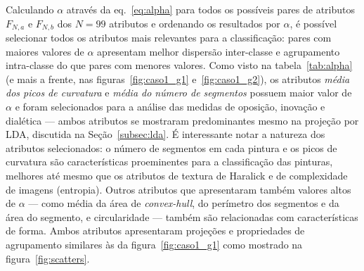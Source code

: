 Calculando $\alpha$ através da eq.~\ref{eq:alpha} para todos os
possíveis pares de atributos $F_{N, a}$ e $F_{N, b}$ dos $N = 99$
atributos e ordenando os resultados por $\alpha$, é possível
selecionar todos os atributos mais relevantes para a classificação:
pares com maiores valores de $\alpha$ apresentam melhor dispersão
inter-classe e agrupamento intra-classe do que pares com menores
valores. Como visto na tabela~\ref{tab:alpha} (e mais a frente, nas
figuras~\ref{fig:caso1_g1} e~\ref{fig:caso1_g2}), os atributos
\emph{média dos picos de curvatura} e \emph{média do número de
  segmentos} possuem maior valor de $\alpha$ e foram selecionados para
a análise das medidas de oposição, inovação e dialética --- ambos
atributos se mostraram predominantes mesmo na projeção por LDA,
discutida na Seção~\ref{subsec:lda}. É interessante notar a natureza
dos atributos selecionados: o número de segmentos em cada pintura e os
picos de curvatura são características proeminentes para a
classificação das pinturas, melhores até mesmo que os atributos de
textura de Haralick e de complexidade de imagens (entropia). Outros
atributos que apresentaram também valores altos de $\alpha$ --- como
média da área de \textit{convex-hull}, do perímetro dos segmentos e da
área do segmento, e circularidade --- também são relacionadas com
características de forma. Ambos atributos apresentaram projeções e
propriedades de agrupamento similares às da figura~\ref{fig:caso1_g1}
como mostrado na figura~\ref{fig:scatters}.
 
